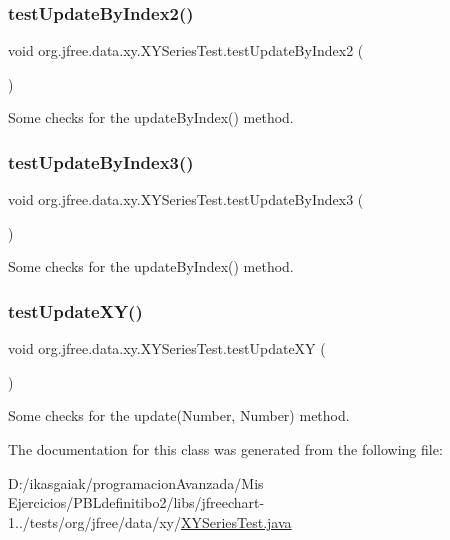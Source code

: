 \subsubsection{\texorpdfstring{test\+Update\+By\+Index2()}{testUpdateByIndex2()}}
{\footnotesize\ttfamily void org.\+jfree.\+data.\+xy.\+X\+Y\+Series\+Test.\+test\+Update\+By\+Index2 (\begin{DoxyParamCaption}{ }\end{DoxyParamCaption})}

Some checks for the update\+By\+Index() method. \mbox{\label{classorg_1_1jfree_1_1data_1_1xy_1_1_x_y_series_test_ad90b360984be33e977e5e129491dccd6}} 
\subsubsection{\texorpdfstring{test\+Update\+By\+Index3()}{testUpdateByIndex3()}}
{\footnotesize\ttfamily void org.\+jfree.\+data.\+xy.\+X\+Y\+Series\+Test.\+test\+Update\+By\+Index3 (\begin{DoxyParamCaption}{ }\end{DoxyParamCaption})}

Some checks for the update\+By\+Index() method. \mbox{\label{classorg_1_1jfree_1_1data_1_1xy_1_1_x_y_series_test_a385565188bc02fb6f4e9cb215b9278e4}} 
\subsubsection{\texorpdfstring{test\+Update\+X\+Y()}{testUpdateXY()}}
{\footnotesize\ttfamily void org.\+jfree.\+data.\+xy.\+X\+Y\+Series\+Test.\+test\+Update\+XY (\begin{DoxyParamCaption}{ }\end{DoxyParamCaption})}

Some checks for the update(\+Number, Number) method. 

The documentation for this class was generated from the following file\+:\begin{DoxyCompactItemize}
\item 
D\+:/ikasgaiak/programacion\+Avanzada/\+Mis Ejercicios/\+P\+B\+Ldefinitibo2/libs/jfreechart-\/1../tests/org/jfree/data/xy/\mbox{\hyperlink{_x_y_series_test_8java}{X\+Y\+Series\+Test.\+java}}\end{DoxyCompactItemize}
